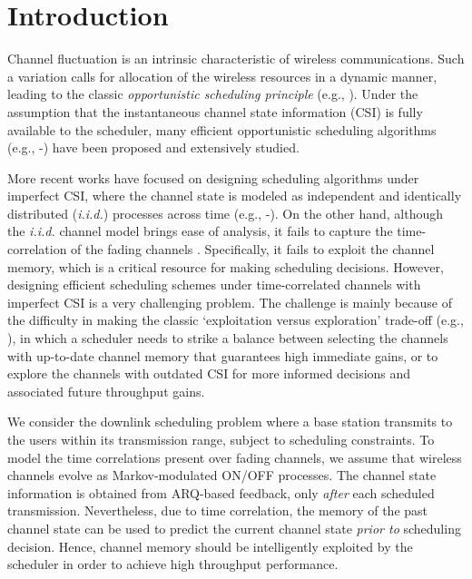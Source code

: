 \documentclass[11pt,twocolumn]{IEEEtran}
\begin{document}
\section{Introduction}

Channel fluctuation is an intrinsic characteristic of wireless communications. Such a variation calls for allocation of the wireless resources in a dynamic manner, leading to the classic \emph{opportunistic scheduling principle} (e.g., \cite{Knopp}\cite{JSAC_Liu}). Under the assumption that the instantaneous channel state information (CSI) is fully available to the scheduler, many efficient opportunistic scheduling algorithms (e.g., \cite{tassiulas}-\cite{Atilla}) have been proposed and extensively studied.

More recent works have focused on designing scheduling algorithms under imperfect CSI, where the channel state is modeled as independent and identically distributed (\textit{i.i.d.}) processes across time (e.g., \cite{2stage}-\cite{Allerton}). On the other hand, although the \textit{i.i.d.} channel model brings ease of analysis, it fails to capture the time-correlation of the fading channels \cite{Tse}. Specifically, it fails to exploit the channel memory, which is a critical resource for making scheduling decisions. However, designing efficient scheduling schemes under time-correlated channels with imperfect CSI is a very challenging problem. The challenge is mainly because of the difficulty in making the classic `exploitation versus exploration' trade-off  (e.g., \cite{clinical,reinforce}), in which a scheduler needs to strike a balance between selecting the channels with up-to-date channel memory that guarantees high immediate gains, or to explore the channels with outdated CSI for more informed decisions and associated future throughput gains.



We consider the downlink scheduling problem where a base station transmits to the users within its transmission range, subject to scheduling constraints. To model the time correlations present over fading channels, we assume that wireless channels evolve as Markov-modulated ON/OFF processes. The channel state information is obtained from ARQ-based feedback, only \emph{after} each scheduled transmission. Nevertheless, due to time correlation, the memory of the past channel state can be used to predict the current channel state \emph{prior to} scheduling decision.
Hence, channel memory should be intelligently exploited by the scheduler in order to achieve high throughput performance.
\end{document}
